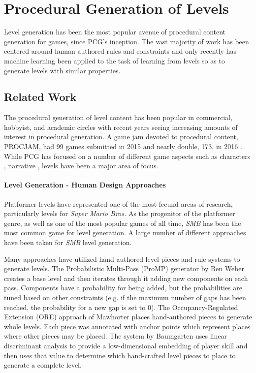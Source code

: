 \documentclass[12pt]{report}
\begin{document}
\chapter*{Procedural Generation of Levels}

Level generation has been the most popular avenue of procedural content generation for games, since PCG's inception.  The vast majority of work has been centered around human authored rules and constraints and only recently has machine learning been applied to the task of learning from levels so as to generate levels with similar properties.

\section*{Related Work}

The procedural generation of level content has been popular in commercial, hobbyist, and academic circles with recent years seeing increasing amounts of interest in procedural generation.   A game jam devoted to procedural content, PROCJAM, had 99 games submitted in 2015 and nearly double, 173, in 2016 \cite{PROCJAM2015,PROCJAM2016}.  While PCG has focused on a number of different game aspects such as characters \cite{SOMETHING}, narrative \cite{SOMETHING}, levels have been a major area of focus.   

\subsubsection*{Level Generation - Human Design Approaches}
Platformer levels have represented one of the most fecund areas of research, particularly levels for \textit{Super Mario Bros.}  As the progenitor of the platformer genre, as well as one of the most popular games of all time, \textit{SMB} has been the most common game for level generation.  A large number of different approaches have been taken for \textit{SMB} level generation.

Many approaches have utilized hand authored level pieces and rule systems to generate levels. The Probabilistic Multi-Pass (ProMP) generator by Ben Weber \cite{mario2010} creates a base level and then iterates through it adding new components on each pass.  Components have a probability for being added, but the probabilities are tuned based on other constraints (e.g. if the maximum number of gaps has been reached, the probability for a new gap is set to 0).  The Occupancy-Regulated Extension (ORE) approach of Mawhorter \cite{mawhorterORE} places hand-authored pieces to generate whole levels.  Each piece was annotated with anchor points which represent places where other pieces may be placed.   The system by Baumgarten \cite{mario2010} uses linear discriminant analysis to provide a low-dimensional embedding of player skill and then uses that value to determine which hand-crafted level pieces to place to generate a complete level. 
\end{document}
